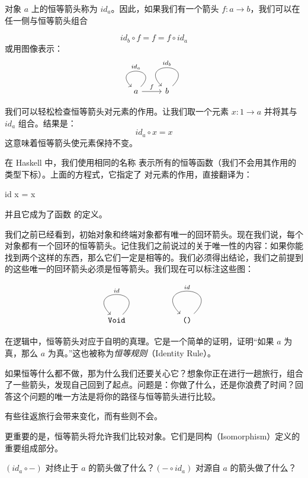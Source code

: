 \documentclass[DaoFP]{subfiles}
\begin{document}
    对象 $a$ 上的恒等箭头称为 $id_a$。因此，如果我们有一个箭头 $f \colon a \to b$，我们可以在任一侧与恒等箭头组合

    \[id_b \circ f = f = f \circ id_a \]
    或用图像表示：
    \[
        \begin{tikzcd}
            a
            \arrow[loop, "id_a"']
            \arrow[r, "f"]
            & b
            \arrow[loop, "id_b"']
        \end{tikzcd}
    \]

    我们可以轻松检查恒等箭头对元素的作用。让我们取一个元素 $x \colon 1 \to a$ 并将其与 $id_a$ 组合。结果是：
    \[id_a \circ x = x\]
    这意味着恒等箭头使元素保持不变。

    在 Haskell 中，我们使用相同的名称  表示所有的恒等函数（我们不会用其作用的类型下标）。上面的方程式，它指定了  对元素的作用，直接翻译为：
    \begin{haskell}
        id x = x
    \end{haskell}
    并且它成为了函数  的定义。

    我们之前已经看到，初始对象和终端对象都有唯一的回环箭头。现在我们说，每个对象都有一个回环的恒等箭头。记住我们之前说过的关于唯一性的内容：如果你能找到两个这样的东西，那么它们一定是相等的。我们必须得出结论，我们之前提到的这些唯一的回环箭头必须是恒等箭头。我们现在可以标注这些图：

    \[
        \begin{tikzcd}
            \hask{Void}
            \arrow[loop, "id"']
        \end{tikzcd}
        \begin{tikzcd}
            \hask{()}
            \arrow[loop, "id"']
        \end{tikzcd}
    \]

    在逻辑中，恒等箭头对应于自明的真理。它是一个简单的证明，证明“如果 $a$ 为真，那么 $a$ 为真。”这也被称为\emph{恒等规则}（Identity Rule）。

    如果恒等什么都不做，那为什么我们还要关心它？想象你正在进行一趟旅行，组合了一些箭头，发现自己回到了起点。问题是：你做了什么，还是你浪费了时间？回答这个问题的唯一方法是将你的路径与恒等箭头进行比较。

    有些往返旅行会带来变化，而有些则不会。

    更重要的是，恒等箭头将允许我们比较对象。它们是同构（Isomorphism）定义的重要组成部分。

    \begin{exercise}\label{ex-yoneda-identity}
    $(id_a \circ -)$ 对终止于 $a$ 的箭头做了什么？$(- \circ id_a)$ 对源自 $a$ 的箭头做了什么？
    \end{exercise}
\end{document}
